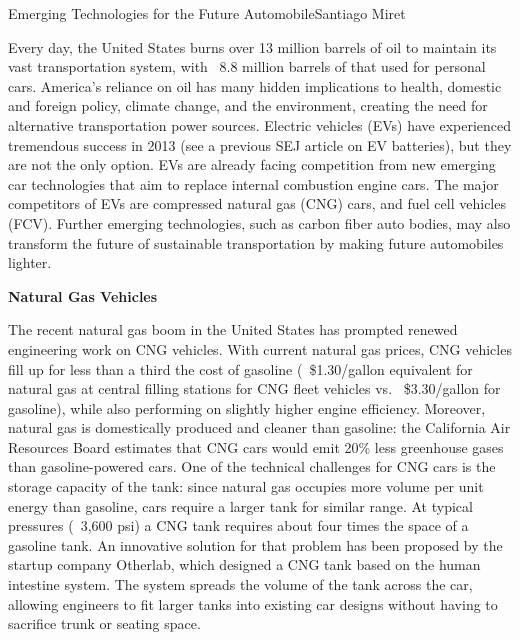 \documentclass{papertex}
\begin{document}
\begin{news}{2}{Emerging Technologies for the Future Automobile}{Santiago Miret}{}{}

Every day, the United States burns over 13 million barrels of oil to maintain its vast transportation system, with ~8.8 million barrels of that used for personal cars. America's reliance on oil has many hidden implications to health, domestic and foreign policy, climate change, and the environment, creating the need for alternative transportation power sources. Electric vehicles (EVs) have experienced tremendous success in 2013 (see a previous SEJ article on EV batteries), but they are not the only option. EVs are already facing competition from new emerging car technologies that aim to replace internal combustion engine cars. The major competitors of EVs are compressed natural gas (CNG) cars, and fuel cell vehicles (FCV). Further emerging technologies, such as carbon fiber auto bodies, may also transform the future of sustainable transportation by making future automobiles lighter.

\textbf{Natural Gas Vehicles}

The recent natural gas boom in the United States has prompted renewed engineering work on CNG vehicles. With current natural gas prices, CNG vehicles fill up for less than a third the cost of gasoline (~\$1.30/gallon equivalent for natural gas at central filling stations for CNG fleet vehicles vs. ~\$3.30/gallon for gasoline), while also performing on slightly higher engine efficiency. Moreover, natural gas is domestically produced and cleaner than gasoline: the California Air Resources Board estimates that CNG cars would emit 20\% less greenhouse gases than gasoline-powered cars. One of the technical challenges for CNG cars is the storage capacity of the tank: since natural gas occupies more volume per unit energy than gasoline, cars require a larger tank for similar range. At typical pressures (~3,600 psi) a CNG tank requires about four times the space of a gasoline tank. An innovative solution for that problem has been proposed by the startup company Otherlab, which designed a CNG tank based on the human intestine system. The system spreads the volume of the tank across the car, allowing engineers to fit larger tanks into existing car designs without having to sacrifice trunk or seating space.


\end{news}
\end{document}
